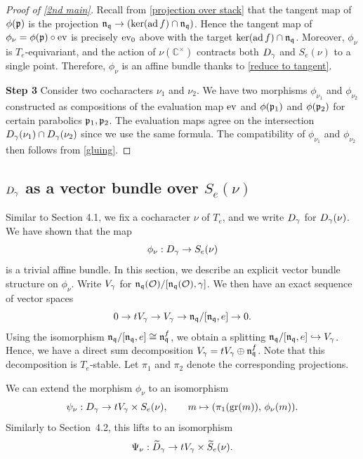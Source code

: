 \documentclass[11pt]{article}
\numberwithin{equation}{section}
\begin{document}
\begin{proof}[Proof of \cref{2nd main}]
Recall from \cref{projection over stack} that the tangent map of $\phi(\mathfrak{p})$ is the projection $\mathfrak{n}_{\mathfrak{q}}\to (\ker(\operatorname{ad} f)\cap \mathfrak{n}_{\mathfrak{q}})$. Hence the tangent map of $\phi_\nu= \phi(\mathfrak{p})\circ \operatorname{ev}$ is precisely $\operatorname{ev}_0$ above with the target $\ker(\operatorname{ad} f)\cap \mathfrak{n}_{\mathfrak{q}}$. Moreover, $\phi_\nu$ is $T_e$-equivariant, and the action of $\nu(\mathbb{C}^\times)$ contracts both $D_\gamma$ and $S_e(\nu)$ to a single point. Therefore, $\phi_\nu$ is an affine bundle thanks to \cref{reduce to tangent}.

\textbf{Step 3} Consider two cocharacters $\nu_1$ and $\nu_2$. We have two morphisms $\phi_{\nu_1}$ and $\phi_{\nu_2}$ constructed as compositions of the evaluation map $\operatorname{ev}$ and $\phi(\mathfrak{p}_1)$ and $\phi(\mathfrak{p}_2)$ for certain parabolics $\mathfrak{p}_1, \mathfrak{p}_2$. The evaluation maps agree on the intersection $D_\gamma(\nu_1)\cap D_\gamma(\nu_2)$ since we use the same formula. The compatibility of $\phi_{\nu_1}$ and $\phi_{\nu_2}$ then follows from \cref{gluing}. 
\end{proof}

\subsection{$D_\gamma$ as a vector bundle over $S_e(\nu)$}
Similar to Section 4.1, we fix a cocharacter $\nu$ of $T_e$, and we write $D_\gamma$ for $D_\gamma(\nu)$. We have shown that the map
\[
\phi_\nu: D_\gamma \to S_e(\nu)
\]
is a trivial affine bundle. In this section, we describe an explicit
vector bundle structure on $\phi_\nu$. Write $V_\gamma$ for $\mathfrak{n}_{\mathfrak{q}}(\mathcal{O})/[\mathfrak{n}_{\mathfrak{q}}(\mathcal{O}),\gamma]$. We then have an exact sequence of vector spaces
$$0\to tV_\gamma\to V_\gamma\to \mathfrak{n}_{\mathfrak{q}}/[\mathfrak{n}_{\mathfrak{q}},e]\to 0.$$
Using the isomorphism $\mathfrak{n}_{\mathfrak{q}}/[\mathfrak{n}_{\mathfrak{q}},e]\cong \mathfrak{n}_{\mathfrak{q}}^{f}$, we obtain a splitting $\mathfrak{n}_{\mathfrak{q}}/[\mathfrak{n}_{\mathfrak{q}},e]\hookrightarrow V_\gamma$. Hence, we have a direct sum decomposition $V_\gamma= tV_\gamma\oplus \mathfrak{n}_{\mathfrak{q}}^{f}$. Note that this decomposition is $T_e$-stable. Let $\pi_1$ and $\pi_2$ denote the corresponding projections. 

\begin{lem}\label{splitting}
We can extend the morphism $\phi_\nu$ to an isomorphism
\[
\psi_\nu: D_\gamma \to tV_\gamma \times S_e(\nu),
\qquad
m \mapsto (\pi_1(\operatorname{gr}(m)),\, \phi_\nu(m)).
\]
Similarly to Section~4.2, this lifts to an isomorphism
\[
\Psi_\nu: \widetilde{D}_\gamma \to tV_\gamma \times \widetilde{S}_e(\nu).
\]
\end{lem}
\end{document}
